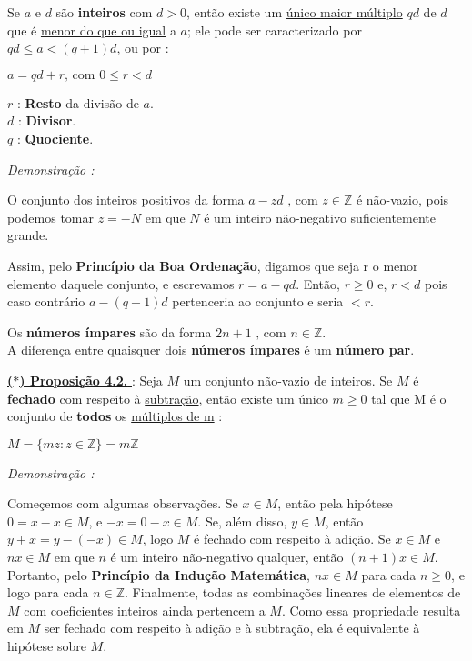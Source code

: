         Se $a$ e $d$ são \textbf{inteiros} com $d > 0$, então existe um \underline{único maior múltiplo} $qd$ de $d$ que é 
        \underline{menor do que ou igual} a $a$; ele pode ser caracterizado por $qd \leq a < (q + 1)d$, ou por : 
        \begin{center}
            $a = qd + r \text{, com } 0 \leq r < d$
        \end{center}

        $r$ : \textbf{Resto} da divisão de $a$. \\
        $d$ : \textbf{Divisor}. \\
        $q$ : \textbf{Quociente}.

        \textit{Demonstração : }

            O conjunto dos inteiros positivos da forma $a - zd \text{ , com } z \in \mathbb{Z}$ é não-vazio, pois podemos
            tomar $z = -N$ em que $N$ é um inteiro não-negativo suficientemente grande.

            Assim, pelo \textbf{\textcolor{cinzaEscuro}{Princípio da Boa Ordenação}}, digamos que seja r o menor elemento daquele conjunto, 
            e escrevamos $r = a - qd$. Então, $r \ge 0$ e, $r < d$ pois caso contrário $a - (q + 1)d$ pertenceria ao conjunto e seria $< r$.

        \begin{exemplo}[]
            Os \textbf{números ímpares} são da forma $2n + 1 \text{ , com } n \in \mathbb{Z}$. \\
            A \underline{diferença} entre quaisquer dois \textbf{números ímpares} é um \textbf{número par}.
        \end{exemplo}

        \vspace{1cm}

        \underline{\underline{ \textbf{\textcolor{cinzaEscuro}{($\ast$) Proposição 4.2.}} }} : Seja $M$ um conjunto não-vazio de inteiros. 
        Se $M$ é \textbf{fechado} com respeito à \underline{subtração}, então existe um único $m \ge 0$ tal que M é o conjunto
        de \textbf{todos} os \underline{múltiplos de m} :

        \begin{center}
            $ M = \{mz : z \in \mathbb{Z} \} = m\mathbb{Z} $
        \end{center}

        \textit{Demonstração : }

            Começemos com algumas observações. Se $x \in M$, então pela hipótese $0 = x - x \in M$, e
            $-x = 0 - x \in M$. Se, além disso, $y \in M$, então $y + x = y - (-x) \in M$, logo $M$ é fechado com respeito à
            adição. Se $x \in M$ e $nx \in M$ em que $n$ é um inteiro não-negativo qualquer, então $(n + 1)x \in M$. Portanto,
            pelo \textbf{\textcolor{cinzaEscuro}{Princípio da Indução Matemática}}, $nx \in M$ para cada $n \ge 0$, e logo para
            cada $n \in \mathbb{Z}$. Finalmente, todas as combinações lineares de elementos de $M$ com coeficientes inteiros ainda
            pertencem a $M$. Como essa propriedade resulta em $M$ ser fechado com respeito à adição e à subtração,
            ela é equivalente à hipótese sobre $M$.  

